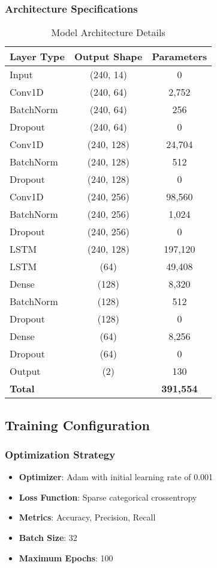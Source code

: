 \documentclass[11pt,a4paper]{article}
\begin{document}
\subsubsection{Architecture Specifications}

\begin{table}[H]
\centering
\caption{Model Architecture Details}
\begin{tabular}{lcc}
\toprule
Layer Type & Output Shape & Parameters \\
\midrule
Input & (240, 14) & 0 \\
Conv1D & (240, 64) & 2,752 \\
BatchNorm & (240, 64) & 256 \\
Dropout & (240, 64) & 0 \\
Conv1D & (240, 128) & 24,704 \\
BatchNorm & (240, 128) & 512 \\
Dropout & (240, 128) & 0 \\
Conv1D & (240, 256) & 98,560 \\
BatchNorm & (240, 256) & 1,024 \\
Dropout & (240, 256) & 0 \\
LSTM & (240, 128) & 197,120 \\
LSTM & (64) & 49,408 \\
Dense & (128) & 8,320 \\
BatchNorm & (128) & 512 \\
Dropout & (128) & 0 \\
Dense & (64) & 8,256 \\
Dropout & (64) & 0 \\
Output & (2) & 130 \\
\midrule
\textbf{Total} & & \textbf{391,554} \\
\bottomrule
\end{tabular}
\end{table}

\subsection{Training Configuration}

\subsubsection{Optimization Strategy}
\begin{itemize}
    \item \textbf{Optimizer}: Adam with initial learning rate of 0.001
    \item \textbf{Loss Function}: Sparse categorical crossentropy
    \item \textbf{Metrics}: Accuracy, Precision, Recall
    \item \textbf{Batch Size}: 32
    \item \textbf{Maximum Epochs}: 100
\end{itemize}
\end{document}
